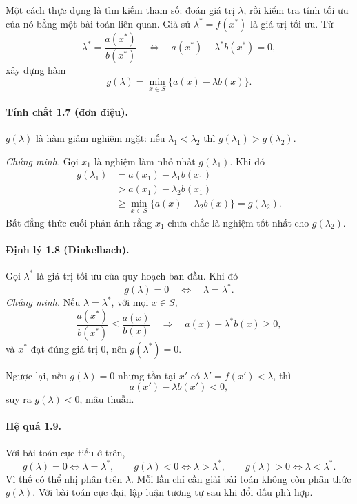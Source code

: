 \documentclass[11pt]{article}
\begin{document}
Một cách thực dụng là tìm kiếm tham số: đoán giá trị \(\lambda\), rồi kiểm tra
tính tối ưu của nó bằng một bài toán liên quan. Giả sử \(\lambda^*=f(x^*)\)
là giá trị tối ưu. Từ
\[
  \lambda^*=\frac{a(x^*)}{b(x^*)}
  \quad\Longleftrightarrow\quad
  a(x^*)-\lambda^* b(x^*)=0,
\]
xây dựng hàm
\[
  g(\lambda)=\min_{x\in S}\{a(x)-\lambda b(x)\}. \tag{1.3}
\]

\paragraph{Tính chất 1.7 (đơn điệu).}
\(g(\lambda)\) là hàm giảm nghiêm ngặt: nếu \(\lambda_1<\lambda_2\) thì
\(g(\lambda_1)>g(\lambda_2)\).

\emph{Chứng minh.}
Gọi \(x_1\) là nghiệm làm nhỏ nhất \(g(\lambda_1)\). Khi đó
\[
\begin{aligned}
g(\lambda_1)&=a(x_1)-\lambda_1 b(x_1)\\
&>a(x_1)-\lambda_2 b(x_1)\\
&\ge \min_{x\in S}\{a(x)-\lambda_2 b(x)\}=g(\lambda_2).
\end{aligned}
\]
Bất đẳng thức cuối phản ánh rằng \(x_1\) chưa chắc là nghiệm tốt nhất cho
\(g(\lambda_2)\).

\paragraph{Định lý 1.8 (Dinkelbach).}
Gọi \(\lambda^*\) là giá trị tối ưu của quy hoạch ban đầu. Khi đó
\[
  g(\lambda)=0 \quad\Longleftrightarrow\quad \lambda=\lambda^*.
\]
\emph{Chứng minh.}
Nếu \(\lambda=\lambda^*\), với mọi \(x\in S\),
\[
  \frac{a(x^*)}{b(x^*)}\le \frac{a(x)}{b(x)}
  \quad\Rightarrow\quad
  a(x)-\lambda^*b(x)\ge 0,
\]
và \(x^*\) đạt đúng giá trị \(0\), nên \(g(\lambda^*)=0\).

Ngược lại, nếu \(g(\lambda)=0\) nhưng tồn tại \(x'\) có
\(\lambda'=f(x')<\lambda\), thì
\[
  a(x')-\lambda b(x')<0,
\]
suy ra \(g(\lambda)<0\), mâu thuẫn.

\paragraph{Hệ quả 1.9.}
Với bài toán cực tiểu ở trên,
\[
  g(\lambda)=0 \Leftrightarrow \lambda=\lambda^*,\qquad
  g(\lambda)<0 \Leftrightarrow \lambda>\lambda^*,\qquad
  g(\lambda)>0 \Leftrightarrow \lambda<\lambda^*.
\]
Vì thế có thể nhị phân trên \(\lambda\). Mỗi lần chỉ cần giải bài toán không
còn phân thức \(g(\lambda)\). Với bài toán cực đại, lập luận tương tự sau khi
đổi dấu phù hợp.
\end{document}
